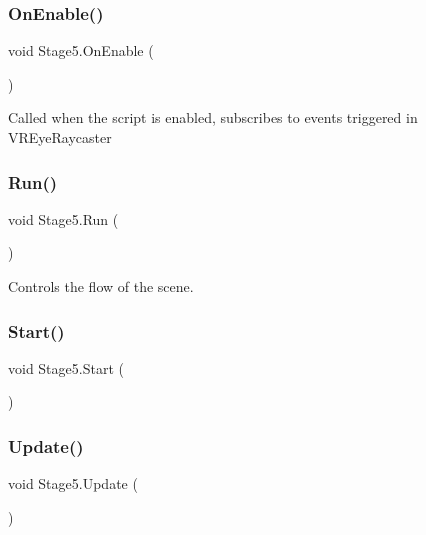 \subsubsection{\texorpdfstring{On\+Enable()}{OnEnable()}}
{\footnotesize\ttfamily void Stage5.\+On\+Enable (\begin{DoxyParamCaption}{ }\end{DoxyParamCaption})\hspace{0.3cm}{\ttfamily [private]}}



Called when the script is enabled, subscribes to events triggered in V\+R\+Eye\+Raycaster 

\mbox{\label{class_stage5_a36b22a4efd98ae6ba0b0b4cd9e058094}} 
\subsubsection{\texorpdfstring{Run()}{Run()}}
{\footnotesize\ttfamily void Stage5.\+Run (\begin{DoxyParamCaption}{ }\end{DoxyParamCaption})\hspace{0.3cm}{\ttfamily [private]}}



Controls the flow of the scene. 

\mbox{\label{class_stage5_ac70bd321f425cb2917a1e8a20cba8524}} 
\subsubsection{\texorpdfstring{Start()}{Start()}}
{\footnotesize\ttfamily void Stage5.\+Start (\begin{DoxyParamCaption}{ }\end{DoxyParamCaption})\hspace{0.3cm}{\ttfamily [private]}}

\mbox{\label{class_stage5_a1eff3e21d86d4460f57f86e692f50af3}} 
\subsubsection{\texorpdfstring{Update()}{Update()}}
{\footnotesize\ttfamily void Stage5.\+Update (\begin{DoxyParamCaption}{ }\end{DoxyParamCaption})\hspace{0.3cm}{\ttfamily [private]}}



